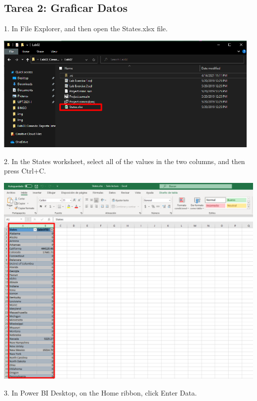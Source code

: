 \documentclass[12pt,letterpaper]{article}
\begin{document}
\subsection*{Tarea 2: Graficar Datos}
1. In File Explorer, and then open the States.xlsx file.
\begin{center}
    \includegraphics[width=13cm]{img/39.png}  
    \vspace{1cm} 
\end{center}
2. In the States worksheet, select all of the values in the two columns, and then press Ctrl+C.
\begin{center}
    \includegraphics[width=16cm]{img/40.png} 
    \vspace{2cm}  
\end{center}
3. In Power BI Desktop, on the Home ribbon, click Enter Data.
\end{document}
